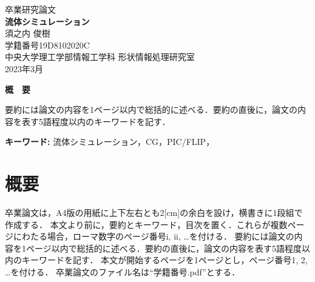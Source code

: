 \documentclass[a4j,12pt]{jreport}
\begin{document}
\thispagestyle{empty}
\begin{center}
\begin{Large}
\vspace*{0.7cm}
{\large 卒業研究論文}\\
\vspace*{2.5cm}
{\bf 流体シミュレーション}\\
\vspace*{7.5cm}
須之内 俊樹\\
学籍番号\hspace*{1zw}19D8102020C\\
\vspace*{2.5cm}
中央大学理工学部情報工学科\hspace*{1zw} 形状情報処理研究室\\
\vspace*{3.0cm}
2023年3月\\
\end{Large}
\end{center}


\newpage
\renewcommand{\baselinestretch}{1.25} \selectfont
{}


\begin{center} {\large \bf{概　要}} \end{center}

要約には論文の内容を1ページ以内で総括的に述べる．要約の直後に，論文の内容を表す5語程度以内のキーワードを記す．


\vspace{1zw} \noindent
{\bf キーワード: }流体シミュレーション，CG，PIC/FLIP，

\tableofcontents


\newpage
{}

\chapter{概要} \label{chapter:1}

卒業論文は，A4版の用紙に上下左右とも2[cm]の余白を設け，横書きに1段組で作成する．
本文より前に，要約とキーワード，目次を置く．これらが複数ページにわたる場合，ローマ数字のページ番号i, ii, …を付ける．
要約には論文の内容を1ページ以内で総括的に述べる．要約の直後に，論文の内容を表す5語程度以内のキーワードを記す．
本文が開始するページを1ページとし，ページ番号1, 2, …を付ける．
卒業論文のファイル名は“学籍番号.pdf”とする．
\end{document}
